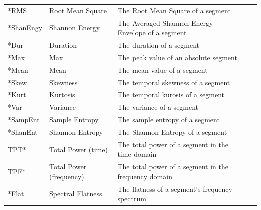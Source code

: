 \documentclass[titlepage, 12pt]{scrartcl} \usepackage{enumitem}
\begin{document}
\begin{table}[H]
\begin{tabulary}{\linewidth}{LLLLL}
*RMS                       & Root Mean Square                                & The Root Mean Square of a segment                                                    \\
*ShanEngy                  & Shannon Energy                                  & The Averaged Shannon Energy Envelope of a segment                                    \\
*Dur                       & Duration                                        & The duration of a segment                                                            \\
*Max                       & Max                                             & The peak value of an absolute segment                                                \\
*Mean                      & Mean                                            & The mean value of a segment                                                          \\
*Skew                      & Skewness                                        & The temporal skewness of a segment                                                   \\
*Kurt                      & Kurtosis                                        & The temporal kurosis of a segment                                                    \\
*Var                       & Variance                                        & The variance of a segment                                                            \\
*SampEnt                   & Sample Entropy                                  & The sample entropy of a segment                                                      \\
*ShanEnt                   & Shannon Entropy                                 & The Shannon Entropy of a segment                                                     \\
TPT*                       & Total Power (time)                              & The total power of a segment in the time domain                                      \\
TPF*                       & Total Power (frequency)                         & The total power of a segment in the frequency domain                                 \\
*Flat                      & Spectral Flatness                               & The flatness of a segment's frequency spectrum                                       \\

\end{tabulary}
\end{table}
\end{document}
